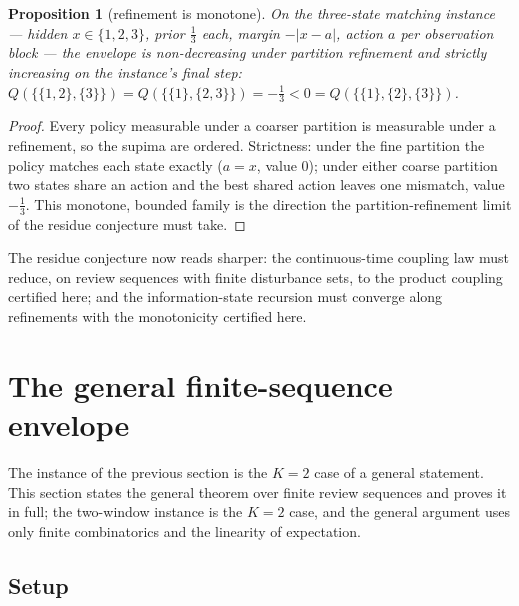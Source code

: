 \documentclass[10pt,twocolumn]{article}
\theoremstyle{plain}
\newtheorem{proposition}[theorem]{Proposition}
\theoremstyle{definition}
\theoremstyle{remark}
\begin{document}
\begin{proposition}[refinement is monotone]\label{dual-prop:refine}
On the three-state matching instance --- hidden $x \in \{1,2,3\}$, prior
$\tfrac13$ each, margin $-|x - a|$, action $a$ per observation block ---
the envelope is non-decreasing under partition refinement and strictly
increasing on the instance's final step:
$Q(\{\{1,2\},\{3\}\}) = Q(\{\{1\},\{2,3\}\}) = -\tfrac13
< 0 = Q(\{\{1\},\{2\},\{3\}\})$.
\end{proposition}
\begin{proof}
Every policy measurable under a coarser partition is measurable under a
refinement, so the supima are ordered. Strictness: under the fine
partition the policy matches each state exactly ($a = x$, value $0$);
under either coarse partition two states share an action and the best
shared action leaves one mismatch, value $-\tfrac13$. This monotone,
bounded family is the direction the partition-refinement limit of the
residue conjecture must take.
\end{proof}

The residue conjecture now reads sharper: the continuous-time coupling
law must reduce, on review sequences with finite disturbance sets, to
the product coupling certified here; and the information-state recursion
must converge along refinements with the monotonicity certified here.

\section{The general finite-sequence envelope}

The instance of the previous section is the $K = 2$ case of a general
statement. This section states the general theorem over finite review
sequences and proves it in full; the two-window instance is the $K = 2$ case, and the general argument uses only finite combinatorics and the linearity of expectation.

\subsection{Setup}
\end{document}
